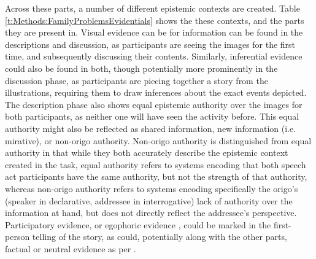Across these parts, a number of different epistemic contexts are created. Table \ref{t:Methods:FamilyProblemsEvidentials} shows the these contexts, and the parts they are present in. Visual evidence can be for information can be found in the descriptions and discussion, as participants are seeing the images for the first time, and subsequently discussing their contents. Similarly, inferential evidence could also be found in both, though potentially more prominently in the discussion phase, as participants are piecing together a story from the illustrations, requiring them to draw inferences about the exact events depicted. The description phase also shows equal epistemic authority over the images for both participants, as neither one will have seen the activity before. This equal authority might also be reflected as shared information, new information (i.e. mirative), or non-origo authority. Non-origo authority is distinguished from equal authority in that while they both accurately describe the epistemic context created in the task, equal authority refers to systems encoding that both speech act participants have the same authority, but not the strength of that authority, whereas non-origo authority refers to systems encoding specifically the origo's (speaker in declarative, addressee in interrogative) lack of authority over the information at hand, but does not directly reflect the addressee's perspective. Participatory evidence, or egophoric evidence \cite[][see ]{Gawne2017}, could be marked in the first-person telling of the story, as could, potentially along with the other parts, factual or neutral evidence as per .

\begin{table}  
  \noindent{}
  \caption{Epistemic contexts covered by each part of the Family Problems Picture Task}\label{t:Methods:FamilyProblemsEvidentials}
\end{table}


